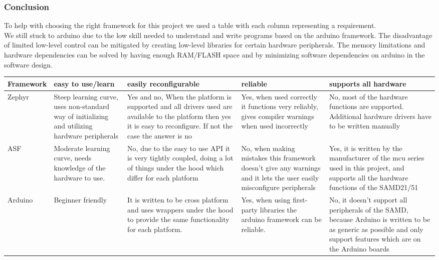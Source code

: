 \subsubsection{Conclusion}
To help with choosing the right framework for this project we used a table with each column representing a requirement.\\
We still stuck to arduino due to the low skill needed to understand and write programs based on the arduino framework. The disadvantage of limited low-level control can be mitigated by creating low-level libraries for certain hardware peripherals. The memory limitations and hardware dependencies can be solved by having enough RAM/FLASH space and by minimizing software dependencies on arduino in the software design.

\begin{center}
\footnotesize
\begin{longtable}{|m{10em}|m{10em}|m{10em}|m{10em}|m{10em}|}
    \hline
    Framework & easy to use/learn & easily reconfigurable & reliable & supports all hardware \\ \hline
    Zephyr & Steep learning curve, uses non-standard way of initializing and utilizing hardware peripherals & Yes and no, When the platform is supported and all drivers used are available to the platform then yes it is easy to reconfigure. If not the case the answer is no & Yes, when used correctly it functions very reliably, gives compiler warnings when used incorrectly & No, most of the hardware functions are supported. Additional hardware drivers have to be written manually \\ \hline
    ASF & Moderate learning curve, needs knowledge of the hardware to use. & No, due to the easy to use API it is very tightly coupled, doing a lot of things under the hood which differ for each platform & No, when making mistakes this framework doesn't give any warnings and it lets the user easily misconfigure peripherals & Yes, it is written by the manufacturer of the mcu series used in this project, and supports all the hardware functions of the SAMD21/51\\ \hline
    Arduino & Beginner friendly & It is written to be cross platform and uses wrappers under the hood to provide the same functionality for each platform. & Yes, when using first-party libraries the arduino framework can be reliable. & No, it doesn't support all peripherals of the SAMD, because Arduino is written to be as generic as possible and only support features which are on the Arduino boards \\ \hline
\end{longtable}
\end{center}
